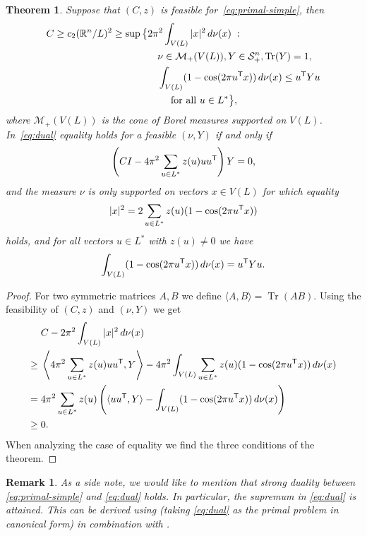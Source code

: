 \documentclass{amsart}
\newtheorem{theorem}[defin]{Theorem}
\newtheorem{remark}[defin]{Remark}
\newcommand{\R}{\mathbb{R}}
\DeclareMathOperator{\Tr}{Tr}
\begin{document}
\begin{theorem}
\label{thm:dual-simple}
Suppose that $(C, z)$ is feasible
for~\eqref{eq:primal-simple}, then
\begin{equation}
\label{eq:dual}
\begin{split}
C \geq c_2(\R^n / L)^2 \geq \sup \big\{ & 2 \pi^2 \int_{V(L)} |x|^2 \, d\nu(x) \; : \\
& \quad \nu \in \mathcal{M}_+(V(L)), Y \in \mathcal{S}^n_+, \Tr(Y) = 1,\\
& \quad \int_{V(L)} (1-\cos(2\pi u^{\sf T} x)) \, d\nu(x) \leq u^{\sf T}
Y u\\
& \qquad \text{ for all } u \in L^*  \big\},
\end{split}
\end{equation}
where $\mathcal{M}_+(V(L))$ is the cone of Borel measures supported on
$V(L)$. In~\eqref{eq:dual} equality holds for a feasible $(\nu,Y)$
if and only if
\[
  \left(C I - 4 \pi^2 \sum_{u\in L^*}z(u) uu^{\sf T}\right) Y =
   0,
\]
and the measure $\nu$ is only supported on vectors $x \in V(L)$ for which equality
\[
  |x|^2 = 2 \sum_{u \in L^*} z(u) (1- \cos(2\pi u^{\sf T} x))
\]
holds, and for all vectors $u \in L^*$ with $z(u) \neq 0$ we have
\[
\int_{V(L)} (1-\cos(2\pi u^{\sf T} x)) \, d\nu(x) = u^{\sf T}
   Y u.
 \]
\end{theorem}
\begin{proof}
For two symmetric matrices $ A,B $ we define $ \langle A, B \rangle = \Tr(AB) $.
 Using the feasibility of $(C,z)$ and $(\nu, Y)$ we get
\begin{align*}
   & C - 2\pi^2 \int_{V(L)} |x|^2 \, d\nu(x) \\
   \geq \; & \left\langle 4 \pi^2 \sum_{u \in L^*} z(u) u u^{\sf T}, Y
             \right\rangle - 4\pi^2 \int_{V(L)} \sum_{u\in L^*} z(u) (1-\cos(2\pi u^{\sf T} x)) \, d\nu (x) \\
   = \; & 4 \pi^2 \sum_{u \in L^*} z(u) \left( \langle uu^{\sf T}, Y \rangle -
          \int_{V(L)} (1 - \cos(2\pi u^{\sf T} x)) \, d \nu(x) \right)\\
  \geq \; & 0.
\end{align*}
When analyzing the case of equality we find the three conditions of
the theorem.
\end{proof}

\begin{remark}
As a side note, we would like to mention that strong duality between \eqref{eq:primal-simple} and \eqref{eq:dual} holds. In particular, the supremum in \eqref{eq:dual} is attained. This can be derived using \cite[(7.2) Theorem]{Barvinok2002} (taking \eqref{eq:dual} as the primal problem in canonical form) in combination with \cite[(7.3) Lemma]{Barvinok2002}.
\end{remark}
\end{document}
